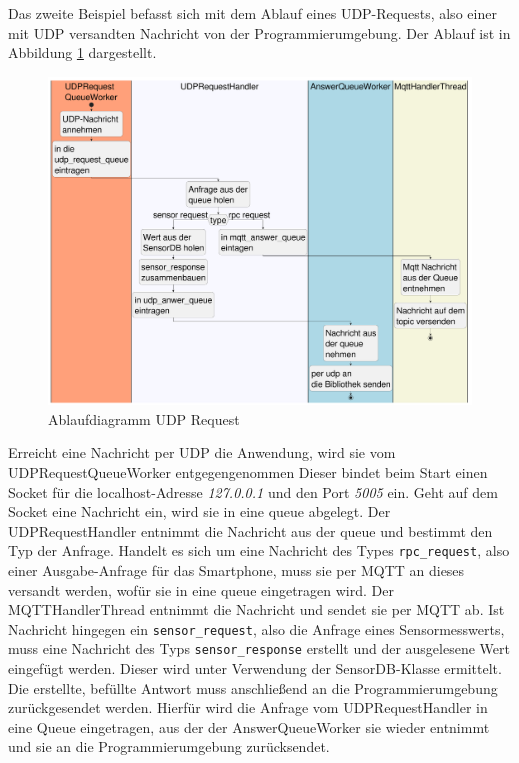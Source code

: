 \documentclass[11pt,a4paper]{report}
\begin{document}
Das zweite Beispiel befasst sich mit dem Ablauf eines UDP-Requests, also einer mit UDP versandten Nachricht von der Programmierumgebung.
Der Ablauf ist in Abbildung \ref{fig:serverUDPReqPath} dargestellt.
\begin{figure}[htbp]
  \centering
  \includegraphics[width=\textwidth]{images/UDPRequestServerPath}
  \caption{Ablaufdiagramm UDP Request}
  \label{fig:serverUDPReqPath}
\end{figure}
Erreicht eine Nachricht per UDP die Anwendung, wird sie vom UDPRequestQueueWorker entgegengenommen
Dieser bindet beim Start einen Socket für die localhost-Adresse \textit{127.0.0.1} und den Port \textit{5005}  ein.
Geht auf dem Socket eine Nachricht ein, wird sie in eine queue abgelegt.
Der UDPRequestHandler entnimmt die Nachricht aus der queue und bestimmt den Typ der Anfrage.
Handelt es sich um eine Nachricht des Types \texttt{rpc\_request}, also einer Ausgabe-Anfrage für das Smartphone, muss sie per MQTT an dieses  versandt werden, wofür sie in eine queue eingetragen wird.
Der MQTTHandlerThread entnimmt die Nachricht und sendet sie per MQTT ab.
Ist Nachricht hingegen ein \texttt{sensor\_request}, also die Anfrage eines Sensormesswerts, muss eine Nachricht des Typs \texttt{sensor\_response} erstellt und der ausgelesene Wert eingefügt werden.
Dieser wird unter Verwendung der SensorDB-Klasse ermittelt.
Die erstellte, befüllte Antwort muss anschließend an die Programmierumgebung zurückgesendet werden.
Hierfür wird die Anfrage vom UDPRequestHandler in eine Queue eingetragen, aus der der AnswerQueueWorker sie wieder entnimmt und sie an die Programmierumgebung zurücksendet.
\end{document}
